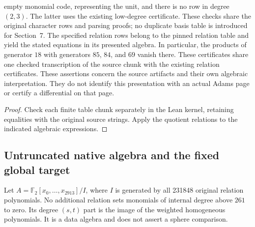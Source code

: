 \begin{lemma}
  empty monomial code, representing the unit, and there is no row in
  degree $(2,3)$. The latter uses the existing low-degree certificate.
  These checks share the original character rows and parsing proofs;
  no duplicate basis table is introduced for Section~7.
  The specified relation rows belong to the
  pinned relation table and yield the stated equations in its presented
  algebra. In particular, the products of generator $18$ with generators
  $85$, $84$, and $69$ vanish there. These certificates share one checked
  transcription of the source chunk with the existing relation certificates.
  These assertions concern the source artifacts and their own
  algebraic interpretation. They do not identify this presentation with an
  actual Adams page or certify a differential on that page.
\end{lemma}
\begin{proof}
  Check each finite table chunk separately in the Lean kernel, retaining
  equalities with the original source strings. Apply the quotient relations
  to the indicated algebraic expressions.
  \leanok
\end{proof}

\subsection{Untruncated native algebra and the fixed global target}

\begin{definition}
  \label{def:lin-e2-native-algebra}
  \leanok
  Let $A=\mathbb F_2[x_0,\ldots,x_{2913}]/I$, where $I$ is generated
  by all 231848 original relation polynomials. No additional relation
  sets monomials of internal degree above $261$ to zero. Its degree
  $(s,t)$ part is the image of the weighted homogeneous polynomials.
  It is a data algebra and does not assert a sphere comparison.
\end{definition}

